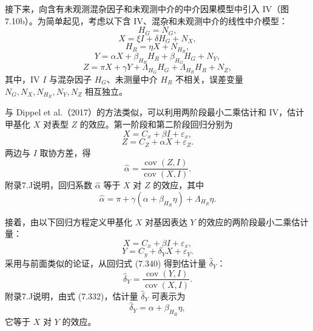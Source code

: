 接下来，向含有未观测混杂因子和未观测中介的中介因果模型中引入 IV（图7.10b）。为简单起见，考虑以下含 IV、混杂和未观测中介的线性中介模型：
\begin{equation}
H_G=N_G,
\tag{7.230}
\end{equation}
\begin{equation}
X=\xi I+\delta H_G+N_X,
\tag{7.231}
\end{equation}
\begin{equation}
H_R=\eta X+N_{H_R},
\tag{7.332}
\end{equation}
\begin{equation}
Y=\alpha X+\beta_{H_R}H_R+\beta_{H_G}H_G+N_Y,
\tag{7.333}
\end{equation}
\begin{equation}
Z=\pi X+\gamma Y+\Lambda_{H_G}H_G+\Lambda_{H_R}H_R+N_Z,
\tag{7.334}
\end{equation}
其中，IV $I$ 与混杂因子 $H_G$、未测量中介 $H_R$ 不相关，误差变量 $N_G,N_X,N_{H_R},N_Y,N_Z$ 相互独立。

与 Dippel et al.（2017）的方法类似，可以利用两阶段最小二乘估计和 IV，估计甲基化 $X$ 对表型 $Z$ 的效应。第一阶段和第二阶段回归分别为
\begin{equation}
X=C_x+\beta I+\varepsilon_x,
\tag{7.335}
\end{equation}
\begin{equation}
Z=C_Z+\alpha X+\varepsilon_Z.
\tag{7.336}
\end{equation}
两边与 $I$ 取协方差，得
\begin{equation}
\widehat\alpha=\frac{\operatorname{cov}(Z,I)}{\operatorname{cov}(X,I)}.
\tag{7.337}
\end{equation}
附录7.J说明，回归系数 $\widehat\alpha$ 等于 $X$ 对 $Z$ 的效应，其中
\begin{equation}
\widehat\alpha=\pi+\gamma(\alpha+\beta_{H_R}\eta)+\Lambda_{H_R}\eta.
\tag{7.338}
\end{equation}

接着，由以下回归方程定义甲基化 $X$ 对基因表达 $Y$ 的效应的两阶段最小二乘估计量：
\begin{equation}
X=C_x+\beta I+\varepsilon_x,
\tag{7.339}
\end{equation}
\begin{equation}
Y=C_y+\delta_YX+\varepsilon_Y.
\tag{7.340}
\end{equation}
采用与前面类似的论证，从回归式 (7.340) 得到估计量 $\widehat\delta_Y$：
\begin{equation}
\widehat\delta_Y=\frac{\operatorname{cov}(Y,I)}{\operatorname{cov}(X,I)}.
\tag{7.341}
\end{equation}
附录7.J说明，由式 (7.332)，估计量 $\widehat\delta_Y$ 可表示为
\begin{equation}
\widehat\delta_Y=\alpha+\beta_{H_R}\eta,
\tag{7.342}
\end{equation}
它等于 $X$ 对 $Y$ 的效应。

